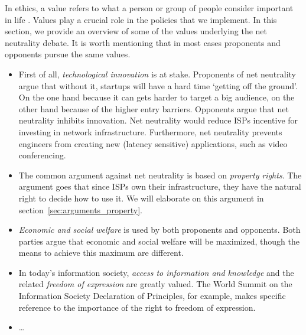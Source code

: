
In ethics, a value refers to what a person or group of people consider important in life \cite{friedman2006value}. Values play a crucial role in the policies that we implement. In this section, we provide an overview of some of the values underlying the net neutrality debate. It is worth mentioning that in most cases proponents and opponents pursue the same values.

\begin{itemize}
\item First of all, \emph{technological innovation} is at stake. Proponents of net neutrality argue that without it, startups will have a hard time `getting off the ground'. On the one hand because it can gets harder to target a big audience, on the other hand because of the higher entry barriers. Opponents argue that net neutrality inhibits innovation. Net neutrality would reduce \acp{ISP} incentive for investing in network infrastructure. Furthermore, net neutrality prevents engineers from creating new (latency sensitive) applications, such as video conferencing.

\item The common argument against net neutrality is based on \emph{property rights}. The argument goes that since \acp{ISP} own their infrastructure, they have the natural right to decide how to use it. We will elaborate on this argument in section~\ref{sec:arguments_property}.

\item \emph{Economic and social welfare} is used by both proponents and opponents. Both parties argue that economic and social welfare will be maximized, though the means to achieve this maximum are different.

\item In today's information society, \emph{access to information and knowledge} and the related \emph{freedom of expression} are greatly valued. The World Summit on the Information Society Declaration of Principles, for example, makes specific reference to the importance of the right to freedom of expression.

\item \ldots
\end{itemize}